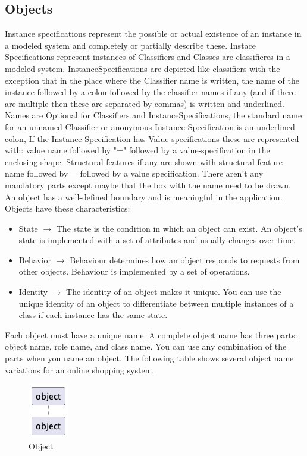 \subsection{Objects}
Instance specifications represent the possible or actual existence of an instance in a modeled system and completely or partially describe these. Instace Specifications represent instances of Classifiers and Classes are classifieres in a modeled system. InstanceSpecifications are depicted like classifiers with the exception that in the place where the Classifier name is written, the name of the instance followed by a colon followed by the classifier names if any (and if there are multiple then these are separated by commas) is written and underlined. Names are Optional for Classifiers and InstanceSpecifications, the standard name for an unnamed Classifier or anonymous Instance Specification is an underlined colon, If the Instance Specification has Value specifications these are represented with: value name followed by "=" followed by a value-specification in the enclosing shape. Structural features if any are shown with structural feature name followed by = followed by a value specification. There aren't any mandatory parts except maybe that the box with the name need to be drawn.\\
 An object has a well-defined boundary and is meaningful in the application. Objects have these characteristics:
\begin{itemize}
	\item State $\rightarrow$ The state is the condition in which an object can exist. An object’s state is implemented with a set of attributes and usually changes over time.
	\item Behavior $\rightarrow$ Behaviour determines how an object responds to requests from other objects. Behaviour is implemented by a set of operations.
	\item Identity $\rightarrow$ The identity of an object makes it unique. You can use the unique identity of an object to differentiate between multiple instances of a class if each instance has the same state.
\end{itemize}
Each object must have a unique name. A complete object name has three parts: object name, role name, and class name. You can use any combination of the parts when you name an object. The following table shows several object name variations for an online shopping system. 
\begin{figure}[hbt]
\label{object}
  \centering\includegraphics{Immagini/test-2.png}
  \caption{Object}
\end{figure}
\cite{OMG-UML_Objects}
